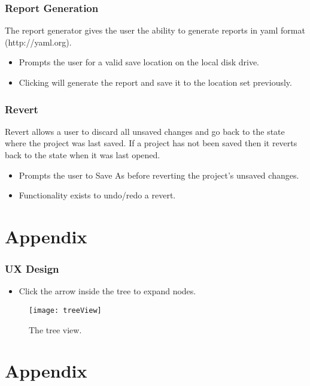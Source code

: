\documentclass[11pt,fleqn]{book} %
\begin{document}
\subsection{Report Generation}
The report generator gives the user the ability to generate reports in yaml format (http://yaml.org).
\begin{itemize}
  \item {} Prompts the user for a valid save location on the local disk drive.
  \item Clicking  will generate the report and save it to the location set previously.
\end{itemize}

\subsection{Revert}
Revert allows a user to discard all unsaved changes and go back to the state where the project was last saved.
If a project has not been saved then it reverts back to the state when it was last opened.
\begin{itemize}
  \item {} Prompts the user to Save As before reverting the project's unsaved changes.
  \item Functionality exists to undo/redo a revert.
\end{itemize}

\appendix
\chapter{Appendix}

\subsection{UX Design}
\begin{itemize}
\item Click the arrow inside the tree to expand nodes.
\end{itemize}

\begin{figure}[H]
  \centering
  \texttt{[image: treeView]}
  \caption{The tree view.\label{treeView}}
\end{figure}










\appendix
\chapter{Appendix}
\end{document}
